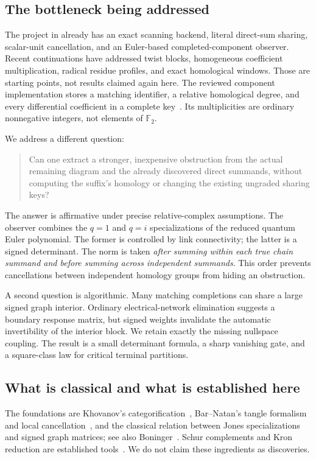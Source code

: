 \documentclass[11pt]{article}
\theoremstyle{definition}
\theoremstyle{remark}
\newcommand{\F}{{\mathbb F_2}}
\begin{document}
\subsection{The bottleneck being addressed}
The project in  already has an exact scanning
backend, literal direct-sum sharing, scalar-unit cancellation, and an
Euler-based completed-component observer. Recent continuations have addressed
twist blocks, homogeneous coefficient multiplication, radical residue
profiles, and exact homological windows. Those are starting points, not
results claimed again here. The reviewed component implementation stores a
matching identifier, a relative homological degree, and every differential
coefficient in a complete key~\cite{repo,component}. Its multiplicities are
ordinary nonnegative integers, not elements of $\F$.

We address a different question:
\begin{quote}
Can one extract a stronger, inexpensive obstruction from the actual
remaining diagram and the already discovered direct summands, without
computing the suffix's homology or changing the existing ungraded sharing
keys?
\end{quote}
The answer is affirmative under precise relative-complex assumptions. The
observer combines the $q=1$ and $q=i$ specializations of the reduced quantum
Euler polynomial. The former is controlled by link connectivity; the latter
is a signed determinant. The norm is taken \emph{after summing within each
true chain summand and before summing across independent summands}. This
order prevents cancellations between independent homology groups from hiding
an obstruction.

A second question is algorithmic. Many matching completions can share a large
signed graph interior. Ordinary electrical-network elimination suggests a
boundary response matrix, but signed weights invalidate the automatic
invertibility of the interior block. We retain exactly the missing nullspace
coupling. The result is a small determinant formula, a sharp vanishing gate,
and a square-class law for critical terminal partitions.

\subsection{What is classical and what is established here}
The foundations are Khovanov's categorification~\cite{khovanov},
Bar--Natan's tangle formalism and local cancellation~\cite{bn-tangles,bn-fast},
and the classical relation between Jones specializations and signed graph
matrices; see also Boninger~\cite{boninger}. Schur complements and Kron
reduction are established tools~\cite{kron}. We do not claim these ingredients
as discoveries.
\end{document}

